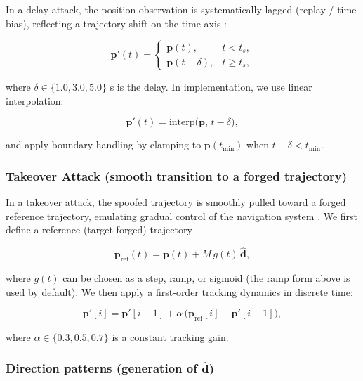 \documentclass{ieeeaccess}
\begin{document}
In a delay attack, the position observation is systematically lagged (replay / time bias), reflecting a trajectory shift on the time axis \cite{ref25}:

\begin{equation}
\mathbf{p}'(t)=
\begin{cases}
\mathbf{p}(t), & t<t_s,\\
\mathbf{p}(t-\delta), & t\ge t_s,
\end{cases}
\end{equation}

where $\delta\in\{1.0,3.0,5.0\}$ s is the delay. In implementation, we use linear interpolation:

\begin{equation}
\mathbf{p}'(t)=\mathrm{interp}\bigl(\mathbf{p},\,t-\delta\bigr),
\end{equation}

and apply boundary handling by clamping to $\mathbf{p}(t_{\min})$ when $t-\delta<t_{\min}$.

\subsubsection{Takeover Attack (smooth transition to a forged trajectory)}

In a takeover attack, the spoofed trajectory is smoothly pulled toward a forged reference trajectory, emulating gradual control of the navigation system \cite{ref26}. We first define a reference (target forged) trajectory

\begin{equation}
\mathbf{p}_{\mathrm{ref}}(t)=\mathbf{p}(t)+M\,g(t)\,\hat{\mathbf{d}},
\end{equation}

where $g(t)$ can be chosen as a step, ramp, or sigmoid (the ramp form above is used by default). We then apply a first-order tracking dynamics in discrete time:

\begin{equation}
\mathbf{p}'[i]=\mathbf{p}'[i-1]+\alpha\,\bigl(\mathbf{p}_{\mathrm{ref}}[i]-\mathbf{p}'[i-1]\bigr),
\end{equation}

where $\alpha\in\{0.3,0.5,0.7\}$ is a constant tracking gain.

\subsubsection{Direction patterns (generation of $\hat{\mathbf{d}}$)}
\end{document}

